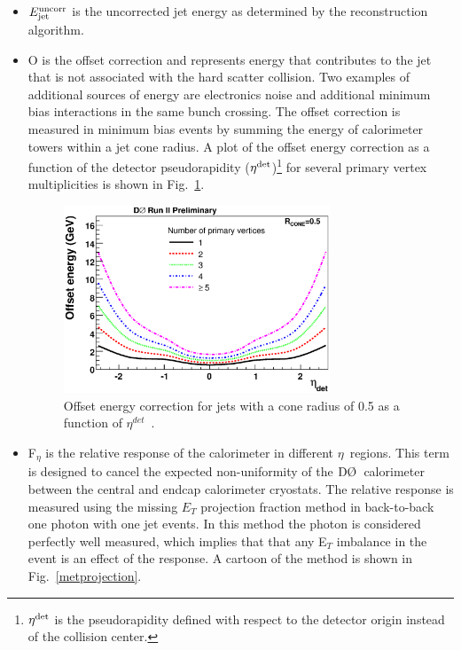 \begin{itemize}
\item $E_{\rm{jet}}^{\rm{uncorr}}$ is the uncorrected jet energy as determined by the reconstruction algorithm.

\item O is the offset correction and represents energy that contributes to the jet that is not associated with the hard scatter collision. Two examples of additional sources of energy are electronics noise and additional minimum bias interactions in the same bunch crossing. The offset correction is measured in minimum bias events by summing the energy of calorimeter towers within a jet cone radius. A plot of the offset energy correction as a function of the detector pseudorapidity ($\eta^{\rm{det}}$)\footnote{$\eta^{\rm{det}}$ is the pseudorapidity defined with respect to the detector origin instead of the collision center.} for several primary vertex multiplicities is shown in Fig.~\ref{jesoffset}.

\begin{figure}[!h!tbp]
\begin{center}
\includegraphics[width=0.75\textwidth]{eps/Reco/jes-offset.eps}
\end{center}
\vspace{-0.1in}
\caption{Offset energy correction for jets with a cone radius of 0.5 as a function of $\eta^{det}$~\cite{jes}.}
\label{jesoffset}
\end{figure}

\item F$_{\eta}$ is the relative response of the calorimeter in different $\eta$~regions. This term is designed to cancel the expected non-uniformity of the $\dzero$~calorimeter between the central and endcap  calorimeter cryostats. The relative response is measured using the missing $E_{T}$ projection fraction method in back-to-back one photon with one jet events. In this method the photon is considered perfectly well measured, which implies that that any E$_{T}$ imbalance in the event is an effect of the response. A cartoon of the method is shown in Fig.~\ref{metprojection}.


\end{itemize}
